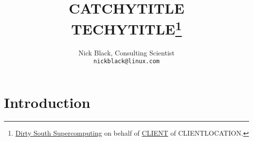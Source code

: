\documentclass[letterpaper,10pt]{article}
\title{CATCHYTITLE\\
TECHYTITLE\thanks{
 \href{https://www.dsscaw.com/}{Dirty South Supercomputing} on behalf
 of \href{WEBSITE}{CLIENT} of CLIENTLOCATION.
}\\
}
\author{Nick Black, Consulting Scientist\\
\texttt{nickblack@linux.com}
}
\begin{document}
\maketitle
\thispagestyle{fancy}
\date{}
\begin{abstract}
\setlength{\parindent}{0pt}
\end{abstract}
\section{Introduction}
\printbibliography
\end{document}

